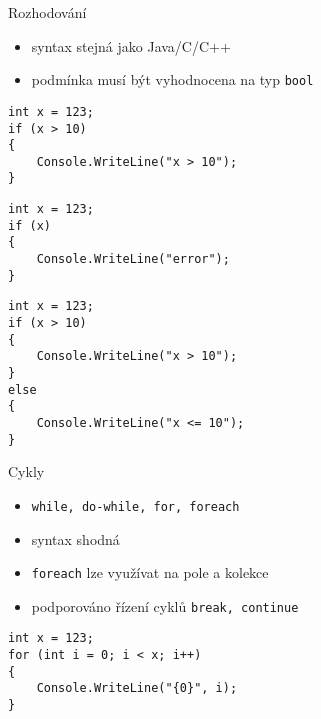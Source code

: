 


\begin{frame}[fragile]
\vfill
\begin{block}{Rozhodování}
\begin{itemize}
\item syntax stejná jako Java/C/C++
\item podmínka musí být vyhodnocena na typ \lstinline|bool|
\end{itemize}
\end{block}
\vfill
\begin{yesblock}
\begin{lstlisting}
int x = 123;
if (x > 10)
{
    Console.WriteLine("x > 10");
}
\end{lstlisting}
\end{yesblock}
\vfill
\begin{noblock}
\begin{lstlisting}
int x = 123;
if (x)
{
    Console.WriteLine("error");
}
\end{lstlisting}
\end{noblock}
\vfill
\end{frame}

\begin{frame}[fragile]
\begin{yesblock}
\begin{lstlisting}
int x = 123;
if (x > 10)
{
    Console.WriteLine("x > 10");
}
else
{
    Console.WriteLine("x <= 10");
}
\end{lstlisting}
\end{yesblock}
\end{frame}





\begin{frame}[fragile]
\vfill
\begin{block}{Cykly}
\begin{itemize}
\item \lstinline|while, do-while, for, foreach|
\item syntax shodná
\item \lstinline|foreach| lze využívat na pole a kolekce
\item podporováno řízení cyklů \lstinline|break, continue|
\end{itemize}
\end{block}
\vfill
\begin{yesblock}
\begin{lstlisting}
int x = 123;
for (int i = 0; i < x; i++) 
{
    Console.WriteLine("{0}", i);
}
\end{lstlisting}
\end{yesblock}
\vfill
\end{frame}




